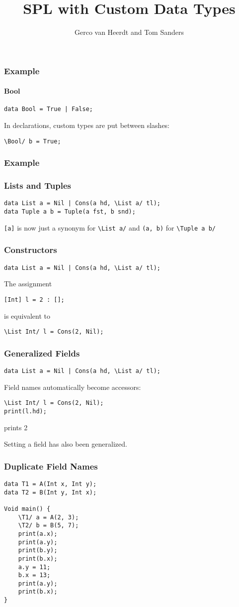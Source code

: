 \documentclass[12pt]{beamer}
\title{SPL with Custom Data Types}
\author{Gerco van Heerdt and Tom Sanders}
\begin{document}
\frame{\titlepage}

\begin{frame}[fragile]
    \frametitle{Example}
    \framesubtitle{Bool}
    \begin{verbatim}
data Bool = True | False;\end{verbatim}
    In declarations, custom types are put between slashes:
    \begin{verbatim}
\Bool/ b = True;\end{verbatim}
\end{frame}

\begin{frame}[fragile]
    \frametitle{Example}
    \frametitle{Lists and Tuples}
    \begin{verbatim}
data List a = Nil | Cons(a hd, \List a/ tl);
data Tuple a b = Tuple(a fst, b snd);\end{verbatim}
    \verb+[a]+ is now just a synonym for \verb+\List a/+ and \verb+(a, b)+ for \verb+\Tuple a b/+
\end{frame}

\begin{frame}[fragile]
    \frametitle{Constructors}
    \begin{verbatim}
data List a = Nil | Cons(a hd, \List a/ tl);\end{verbatim}
    The assignment
    \begin{verbatim}
[Int] l = 2 : [];\end{verbatim}
    is equivalent to
    \begin{verbatim}
\List Int/ l = Cons(2, Nil);\end{verbatim}
\end{frame}

\begin{frame}[fragile]
    \frametitle{Generalized Fields}
    \begin{verbatim}
data List a = Nil | Cons(a hd, \List a/ tl);\end{verbatim}
    Field names automatically become accessors:
    \begin{verbatim}
\List Int/ l = Cons(2, Nil);
print(l.hd);\end{verbatim}
    prints 2

    Setting a field has also been generalized.
\end{frame}

\begin{frame}[fragile]
    \frametitle{Duplicate Field Names}
    \begin{verbatim}
data T1 = A(Int x, Int y);
data T2 = B(Int y, Int x);

Void main() {
    \T1/ a = A(2, 3);
    \T2/ b = B(5, 7);
    print(a.x);
    print(a.y);
    print(b.y);
    print(b.x);
    a.y = 11;
    b.x = 13;
    print(a.y);
    print(b.x);
}\end{verbatim}
\end{frame}
\end{document}
